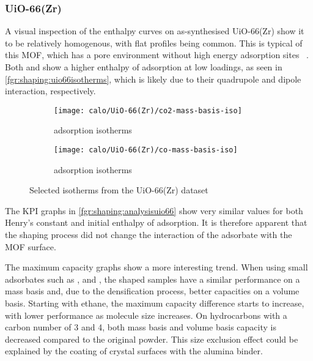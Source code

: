 
\subsubsection{UiO-66(Zr)}

A visual inspection of the enthalpy curves on as-synthesised UiO-66(Zr)
show it to be relatively homogenous, with flat
profiles being common. This is typical of this MOF, which has
a pore environment without high energy adsorption sites
~\cite{wiersumEvaluationUiO66GasBased2011}.
Both  and  show a higher enthalpy of adsorption
at low loadings, as seen in \autoref{fgr:shaping:uio66isotherms},
which is likely due to their quadrupole and dipole interaction,
respectively.

\begin{figure}[htb]
	\centering
	\begin{subfigure}{0.45\textwidth}
		\texttt{[image: calo/UiO-66(Zr)/co2-mass-basis-iso]}
		\caption{ adsorption isotherms}%
		\label{fgr:shaping:uio66co2ads}
	\end{subfigure}
	\begin{subfigure}{0.45\textwidth}
		\texttt{[image: calo/UiO-66(Zr)/co-mass-basis-iso]}
		\caption{ adsorption isotherms}%
		\label{fgr:shaping:uio66coads}
	\end{subfigure}%
	\caption{Selected isotherms from the UiO-66(Zr) dataset}%
	\label{fgr:shaping:uio66isotherms}
\end{figure}

The KPI graphs in \autoref{fgr:shaping:analysisuio66} show very
similar values for both Henry's constant and initial
enthalpy of adsorption. It is therefore apparent that the shaping process
did not change the interaction of the adsorbate with the MOF surface.

The maximum capacity graphs show a more interesting trend.
When using small adsorbates such as ,  and ,
the shaped samples have a similar performance on a mass basis and,
due to the densification process, better capacities on a volume
basis. Starting with ethane, the maximum capacity difference starts
to increase, with lower performance as molecule size increases.
On hydrocarbons with a carbon number of 3 and 4, both mass basis and
volume basis capacity is decreased compared to the original powder.
This size exclusion effect could be explained by the coating of
crystal surfaces with the alumina binder.

